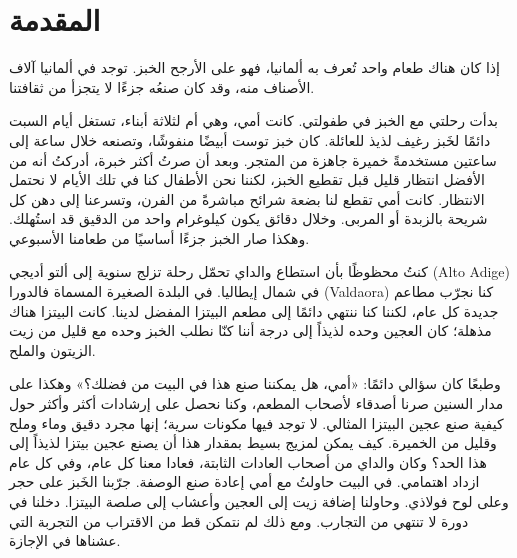 %
%

\chapter{المقدمة}%
\label{ch:Preface}

إذا كان هناك طعام واحد تُعرف به ألمانيا، فهو على الأرجح الخبز. توجد في
ألمانيا آلاف الأصناف منه، وقد كان صنعُه جزءًا لا يتجزأ من ثقافتنا.

بدأت رحلتي مع الخبز في طفولتي. كانت أمي، وهي أم لثلاثة أبناء، تستغل أيام
السبت دائمًا لخَبز رغيف لذيذ للعائلة. كان خبز توست أبيضًا منفوشًا، وتصنعه
خلال ساعة إلى ساعتين مستخدمةً خميرة جاهزة من المتجر. وبعد أن صرتُ أكثر
خبرة، أدركتُ أنه من الأفضل انتظار قليل قبل تقطيع الخبز، لكننا نحن الأطفال
كنا في تلك الأيام لا نحتمل الانتظار. كانت أمي تقطع لنا بضعة شرائح
مباشرةً من الفرن، وتسرعنا إلى دهن كل شريحة بالزبدة أو المربى. وخلال دقائق
يكون كيلوغرام واحد من الدقيق قد استُهلك. وهكذا صار الخبز جزءًا أساسيًا من
طعامنا الأسبوعي.

كنتُ محظوظًا بأن استطاع والداي تحمّل رحلة تزلج سنوية إلى ألتو أديجي
\textenglish{(Alto Adige)} في شمال إيطاليا. في البلدة الصغيرة المسماة
فالدورا \textenglish{(Valdaora)} كنا نجرّب مطاعم جديدة كل عام، لكننا كنا
ننتهي دائمًا إلى مطعم البيتزا المفضل لدينا. كانت البيتزا هناك مذهلة؛ كان
العجين وحده لذيذاً إلى درجة أننا كنّا نطلب الخبز وحده مع قليل من زيت
الزيتون والملح.

وطبعًا كان سؤالي دائمًا: «أمي، هل يمكننا صنع هذا في البيت من فضلك؟» وهكذا
على مدار السنين صرنا أصدقاء لأصحاب المطعم، وكنا نحصل على إرشادات أكثر
وأكثر حول كيفية صنع عجين البيتزا المثالي. لا توجد فيها مكونات سرية؛ إنها
مجرد دقيق وماء وملح وقليل من الخميرة. كيف يمكن لمزيج بسيط بمقدار هذا أن
يصنع عجين بيتزا لذيذاً إلى هذا الحد؟ وكان والداي من أصحاب العادات
الثابتة، فعادا معنا كل عام، وفي كل عام ازداد اهتمامي. في البيت حاولتُ مع
أمي إعادة صنع الوصفة. جرّبنا الخَبز على حجر وعلى لوح فولاذي. وحاولنا
إضافة زيت إلى العجين وأعشاب إلى صلصة البيتزا. دخلنا في دورة لا تنتهي من
التجارب. ومع ذلك لم نتمكن قط من الاقتراب من التجربة التي عشناها في
الإجازة.

